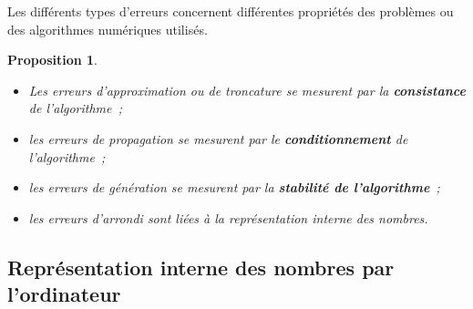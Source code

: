 \documentclass{article}
\newtheorem{prp}[thm]{Proposition}
\theoremstyle{definition}
\theoremstyle{remark}
\begin{document}
		Les différents types d'erreurs concernent différentes propriétés des problèmes ou des algorithmes numériques utilisés.

		\begin{prp}~
		\begin{itemize}
			\item Les erreurs d'approximation ou de troncature se mesurent par la \textbf{consistance} de l'algorithme~;
			\item les erreurs de propagation se mesurent par le \textbf{conditionnement} de l'algorithme~;
			\item les erreurs de génération se mesurent par la \textbf{stabilité de l'algorithme}~;
			\item les erreurs d'arrondi sont liées à la représentation interne des nombres.
		\end{itemize}
		\end{prp}

	\subsection{Représentation interne des nombres par l'ordinateur}
\end{document}
